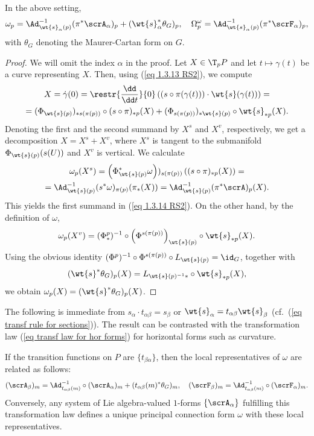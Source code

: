 \begin{prop}[{{\cite[Prop.~1.3.11]{RS2}}}]
    In the above setting, 
    \[\omega_p=\Ad_{\wt{s}_\alpha(p)}^{-1}(\pi^\ast\scrA_\alpha)_p+(\wt{s}_\alpha^\ast \theta_G)_p,\quad \Omega^\omega_p=\Ad_{\wt{s}_\alpha(p)}^{-1}(\pi^\ast \scrF_\alpha)_p, \label{eq 1.3.14 RS2}\]
    with $\theta_G$ denoting the Maurer-Cartan form on $G$.
\end{prop}
\begin{proof}
    We will omit the index $\alpha$ in the proof. Let $X\in \T_pP$ and let $t\mapsto \gamma(t)$ be a curve representing $X$. Then, using (\ref{eq 1.3.13 RS2}), we compute
    \begin{multline}
        X=\dot\gamma(0)=\restr{\frac{\dd}{\dd t}}{0} \left((s\circ \pi(\gamma(t)))\cdot \wt{s}(\gamma(t))\right)=\\
        =(\Phi_{\wt{s}(p)})_{\ast s(\pi(p))}\circ (s\circ \pi)_{\ast p}(X)+(\Phi_{s(\pi(p))})_{\ast\wt{s}(p)}\circ \wt{s}_{\ast p}(X).
    \end{multline}
    Denoting the first and the second summand by $X^s$ and $X^v$, respectively, we get a decomposition $X=X^s+X^v$, where $X^s$ is tangent to the submanifold $\Phi_{\wt{s}(p)}(s(U))$ and $X^v$ is vertical. We calculate
    \begin{multline}
        \omega_p(X^s)=\left(\Phi_{\wt{s}(p)}^\ast\omega\right))_{s(\pi(p))}\left((s\circ\pi)_{\ast p}(X)\right)=\\
        =\Ad_{\wt{s}(p)}^{-1}(s^\ast \omega)_{\pi(p)}(\pi_\ast(X))=\Ad_{\wt{s}(p)}^{-1}(\pi^\ast\scrA)_p(X).
    \end{multline}
    This yields the first summand in (\ref{eq 1.3.14 RS2}). On the other hand, by the definition of $\omega$, 
    \[\omega_p(X^v)=(\Phi^p_{\ast})^{-1}\circ \left(\Phi^{s(\pi(p))}\right)_{\wt{s}(p)}\circ \wt{s}_{\ast p}(X).\]
    Using the obvious identity $(\Phi^p)^{-1}\circ \Phi^{s(\pi(p))}\circ L_{\wt{s}(p)}=\id_G$, together with
    \[(\wt{s}^\ast \theta_G)_p(X)=L_{\wt{s}(p)^{-1}\ast }\circ\wt{s}_{\ast p}(X),\]
    we obtain $\omega_p(X)=(\wt{s}^\ast\theta_G)_p(X)$.
\end{proof}
The following is immediate from $s_\alpha\cdot t_{\alpha\beta}=s_\beta$  or $\wt{s}_\alpha=t_{\alpha\beta}\wt{s}_\beta$ (cf.\ (\ref{eq transf rule for sections})). The result can be contrasted with the transformation law (\ref{eq transf law for hor forms}) for horizontal forms such as curvature.
\begin{cor}[{{\cite[Cor.~1.3.12]{RS2}}}]\label{cor 1.3.12 RS2}
    If the transition functions on $P$ are $\{t_{\beta\alpha}\}$, then the local representatives of $\omega$ are related as follows:
    \[(\scrA_\beta)_m=\Ad_{t_{\alpha\beta}(m)}^{-1}\circ (\scrA_\alpha)_m+(t_{\alpha\beta}(m)^\ast\theta_G)_m,\quad (\scrF_\beta)_m=\Ad_{t_{\alpha\beta}(m)}^{-1}\circ (\scrF_\alpha)_m.\label{eq 1.3.15 RS2}\]
    Conversely, any system of Lie algebra-valued $1$-forms $\{\scrA_\alpha\}$ fulfilling this transformation law defines a unique principal connection form $\omega$ with these local representatives.
\end{cor}

